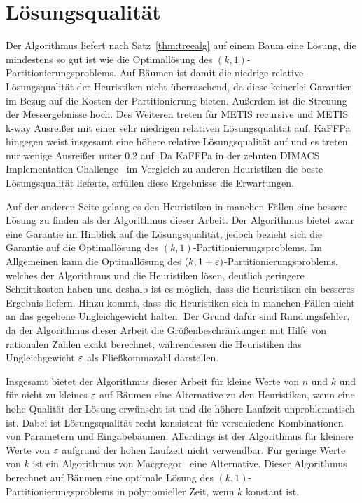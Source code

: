 \section{Lösungsqualität}
Der Algorithmus liefert nach Satz~\ref{thm:treealg} auf einem Baum eine Lösung, die mindestens so gut ist wie die Optimallösung des $(k, 1)$\hyp Partitionierungsproblems.
Auf Bäumen ist damit die niedrige relative Lösungsqualität der Heuristiken nicht überraschend, da diese keinerlei Garantien im Bezug auf die Kosten der Partitionierung bieten.
Außerdem ist die Streuung der Messergebnisse hoch. 
Des Weiteren treten für METIS recursive und METIS k-way Ausreißer mit einer sehr niedrigen relativen Lösungsqualität auf.
KaFFPa hingegen weist insgesamt eine höhere relative Lösungsqualität auf und es treten nur wenige Ausreißer unter $0.2$ auf.
Da KaFFPa in der zehnten DIMACS Implementation Challenge~\cite{BMS+13} im Vergleich zu anderen Heuristiken die beste Lösungsqualität lieferte, erfüllen diese Ergebnisse die Erwartungen.

Auf der anderen Seite gelang es den Heuristiken in manchen Fällen eine bessere Lösung zu finden als der Algorithmus dieser Arbeit.
Der Algorithmus bietet zwar eine Garantie im Hinblick auf die Lösungsqualität, jedoch bezieht sich die Garantie auf die Optimallösung des $(k,1)$\hyp Partitionierungsproblems.
Im Allgemeinen kann die Optimallösung des $(k, 1+\varepsilon)$\hyp Partitionierungsproblems, welches der Algorithmus und die Heuristiken lösen, deutlich geringere Schnittkosten haben und deshalb ist es möglich, dass die Heuristiken ein besseres Ergebnis liefern.
Hinzu kommt, dass die Heuristiken sich in manchen Fällen nicht an das gegebene Ungleichgewicht halten.
Der Grund dafür sind Rundungsfehler, da der Algorithmus dieser Arbeit die Größenbeschränkungen mit Hilfe von rationalen Zahlen exakt berechnet, währendessen die Heuristiken das Ungleichgewicht $\varepsilon$ als Fließkommazahl darstellen.

Insgesamt bietet der Algorithmus dieser Arbeit für kleine Werte von $n$ und $k$ und für nicht zu kleines $\varepsilon$ auf Bäumen eine Alternative zu den Heuristiken, wenn eine hohe Qualität der Lösung erwünscht ist und die höhere Laufzeit unproblematisch ist.
Dabei ist Lösungsqualität recht konsistent für verschiedene Kombinationen von Parametern und Eingabebäumen.
Allerdings ist der Algorithmus für kleinere Werte von $\varepsilon$ aufgrund der hohen Laufzeit nicht verwendbar.
Für geringe Werte von $k$ ist ein Algorithmus von Macgregor~\cite{mcg78} eine Alternative.
Dieser Algorithmus berechnet auf Bäumen eine optimale Lösung des $(k,1)$\hyp Partitionierungsproblems in polynomieller Zeit, wenn $k$ konstant ist.

